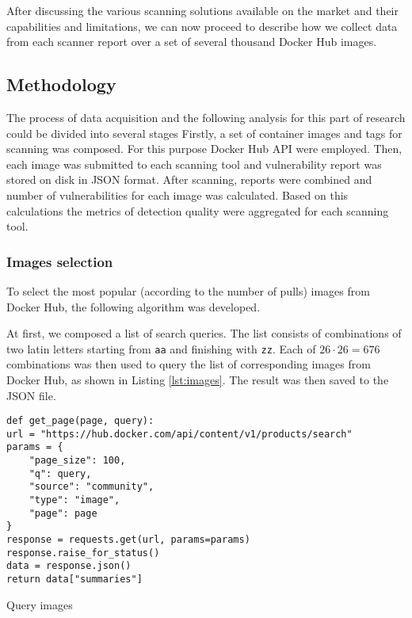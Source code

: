 After discussing the various scanning solutions available on the market and their capabilities and limitations, we can now proceed to describe how we collect data from each scanner report over a set of several thousand Docker Hub images.


\clearpage
\subsection{Methodology}

The process of data acquisition and the following analysis for this part of research could be divided into several stages Firstly, a set of container images and tags for scanning was composed. For this purpose Docker Hub API were employed. Then, each image was submitted to each scanning tool and vulnerability report was stored on disk in JSON format. After scanning, reports were combined and number of vulnerabilities for each image was calculated. Based on this calculations the metrics of detection quality were aggregated for each scanning tool.

\subsubsection{Images selection}

To select the most popular (according to the number of pulls) images from Docker Hub, the following algorithm was developed.

At first, we composed a list of search queries. The list consists of combinations of two latin letters starting from \texttt{aa} and finishing with \texttt{zz}. Each of $26 \cdot 26 = 676$ combinations was then used to query the list of corresponding images from Docker Hub, as shown in Listing \ref{lst:images}. The result was then saved to the JSON file.
\begin{listing}[htp]
    \centering
    \begin{minipage}{0.8\linewidth}
        \begin{verbatim}
def get_page(page, query):
url = "https://hub.docker.com/api/content/v1/products/search"
params = {
    "page_size": 100,
    "q": query,
    "source": "community",
    "type": "image",
    "page": page
}
response = requests.get(url, params=params)
response.raise_for_status()
data = response.json()
return data["summaries"]
        \end{verbatim}
    \end{minipage}
    \caption{Query images}
    \label{lst:images}
\end{listing}


